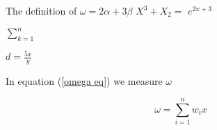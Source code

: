 \documentclass{article}
\begin{document}
	The definition of $\omega = 2\alpha + 3\beta$ %
	$X^3 + X_2 = $ %
	$e^{2x + 3}$ %
	
	$\sum_{k=1}^n$ %
	
	$d=\frac{5x}{y}$ %
	
	In equation (\ref{omega eq}) we measure $\omega$ %
	
	\begin{equation} %
		\label{omega eq} %
		\omega = \sum_{i=1}^{n}w_ix
	\end{equation}
\end{document}
